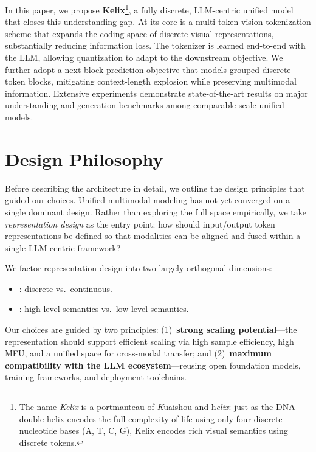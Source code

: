 \documentclass[11pt, a4paper, logo, copyright]{googledeepmind}
\begin{document}
In this paper, we propose \textbf{Kelix}\footnote{The name \emph{Kelix} is a portmanteau of \emph{K}uaishou and h\emph{elix}: just as the DNA double helix encodes the full complexity of life using only four discrete nucleotide bases (A, T, C, G), Kelix encodes rich visual semantics using discrete tokens.}, a fully discrete, LLM-centric unified model that closes this understanding gap. At its core is a multi-token vision tokenization scheme that expands the coding space of discrete visual representations, substantially reducing information loss. The tokenizer is learned end-to-end with the LLM, allowing quantization to adapt to the downstream objective. We further adopt a next-block prediction objective that models grouped discrete token blocks, mitigating context-length explosion while preserving multimodal information. Extensive experiments demonstrate state-of-the-art results on major understanding and generation benchmarks among comparable-scale unified models.










\section{Design Philosophy}
\label{sec2_Design}

Before describing the architecture in detail, we outline the design principles that guided our choices. Unified multimodal modeling has not yet converged on a single dominant design. Rather than exploring the full space empirically, we take \emph{representation design} as the entry point: how should input/output token representations be defined so that modalities can be aligned and fused within a single LLM-centric framework?

We factor representation design into two largely orthogonal dimensions:
\begin{itemize}
    \item {}: discrete vs.\ continuous.
    \item {}: high-level semantics vs.\ low-level semantics.
\end{itemize}
Our choices are guided by two principles: (1)~\textbf{strong scaling potential}---the representation should support efficient scaling via high sample efficiency, high MFU, and a unified space for cross-modal transfer; and (2)~\textbf{maximum compatibility with the LLM ecosystem}---reusing open foundation models, training frameworks, and deployment toolchains.
\end{document}
